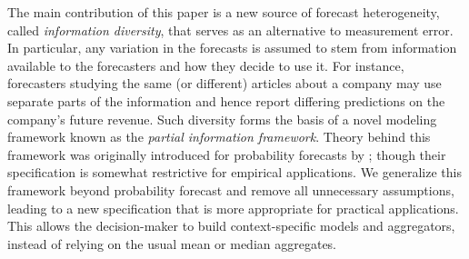 \documentclass[11pt]{article}
\theoremstyle{definition}
\theoremstyle{definition}
\begin{document}
%





The main contribution of this paper is a new source of forecast heterogeneity, called \textit{information diversity}, that serves as an alternative to measurement error. In particular,  any variation in the forecasts is assumed to stem from information available to the forecasters and how they decide to use it. For instance, forecasters studying the same (or different) articles about a company may use separate parts of the information and hence report differing predictions on the company's future revenue. Such diversity forms the basis of a novel modeling framework known as the \textit{partial information framework}. Theory behind this framework was originally introduced for probability forecasts by \cite{satopaamodeling}; though their specification is somewhat restrictive for empirical applications. We generalize this framework beyond probability forecast and remove all unnecessary assumptions, leading to a new specification that is more appropriate for practical applications. This allows the decision-maker to build context-specific models and aggregators, instead of relying on the usual mean or median aggregates.
\end{document}
